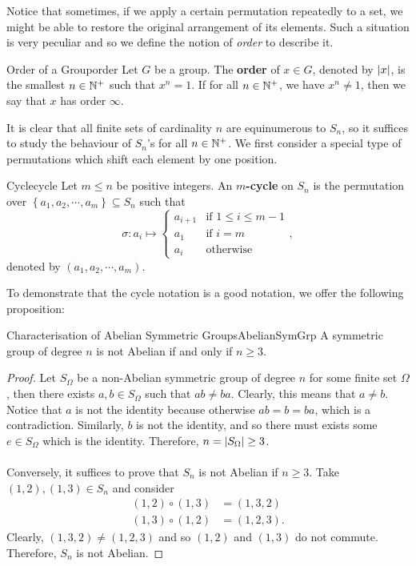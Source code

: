 \documentclass[math]{amznotes}
\theoremstyle{remark}
\newcommand{\0}{\mathbf{0}}
\newcommand{\1}{\mathbf{1}}
\begin{document}
Notice that sometimes, if we apply a certain permutation repeatedly to a set, we might be able to restore the original arrangement of its elements. Such a situation is very peculiar and so we define the notion of \textit{order} to describe it.
\begin{dfnbox}{Order of a Group}{order}
    Let $G$ be a group. The {\color{red} \textbf{order}} of $x \in G$, denoted by ${\left\lvert {x} \right\rvert}$, is the smallest $n \in \mathbb{N}^+$ such that $x^n = 1$. If for all $n \in \mathbb{N}^+$, we have $x^n \neq 1$, then we say that $x$ has order $\infty$.
\end{dfnbox}
It is clear that all finite sets of cardinality $n$ are equinumerous to $S_n$, so it suffices to study the behaviour of $S_n$'s for all $n \in \mathbb{N}^+$. We first consider a special type of permutations which shift each element by one position.
\begin{dfnbox}{Cycle}{cycle}
    Let $m \leq n$ be positive integers. An {\color{red} \textbf{$m$-cycle}} on $S_n$ is the permutation over $\left\{a_1, a_2, \cdots, a_m\right\} \subseteq S_n$ such that
    \begin{equation*}
        \sigma \colon a_i \mapsto \begin{cases}
            a_{i + 1} & \textrm{if } 1 \leq i \leq m - 1 \\
            a_1 & \textrm{if } i = m \\
            a_i & \textrm{otherwise}
        \end{cases},
    \end{equation*}
    denoted by $\left(a_1, a_2, \cdots, a_m\right)$.
\end{dfnbox}
To demonstrate that the cycle notation is a good notation, we offer the following proposition:
\begin{probox}{Characterisation of Abelian Symmetric Groups}{AbelianSymGrp}
    A symmetric group of degree $n$ is not Abelian if and only if $n \geq 3$.
    \tcblower
    \begin{proof}
        Let $S_{\Omega}$ be a non-Abelian symmetric group of degree $n$ for some finite set $\Omega$, then there exists $a, b \in S_{\Omega}$ such that $ab \neq ba$. Clearly, this means that $a \neq b$. Notice that $a$ is not the identity because otherwise $ab = b = ba$, which is a contradiction. Similarly, $b$ is not the identity, and so there must exists some $e \in S_{\Omega}$ which is the identity. Therefore, $n = {\left\lvert {S_{\Omega}} \right\rvert} \geq 3$.
        \\\\
        Conversely, it suffices to prove that $S_n$ is not Abelian if $n \geq 3$. Take $\left(1, 2\right), \left(1, 3\right) \in S_n$ and consider 
        \begin{align*}
            \left(1, 2\right) \circ \left(1, 3\right) & = \left(1, 3, 2\right) \\
            \left(1, 3\right) \circ \left(1, 2\right) & = \left(1, 2, 3\right).
        \end{align*}
        Clearly, $\left(1, 3, 2\right) \neq \left(1, 2, 3\right)$ and so $\left(1, 2\right)$ and $\left(1, 3\right)$ do not commute. Therefore, $S_n$ is not Abelian.
    \end{proof}
\end{probox}
\end{document}
